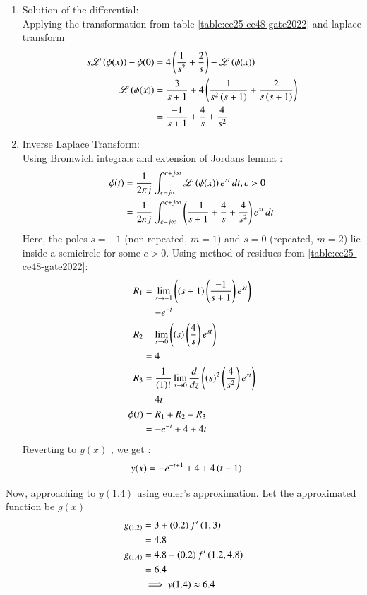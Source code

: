 \documentclass[journal,12pt,onecolumn]{IEEEtran}
\theoremstyle{remark}
\begin{document}
\begin{enumerate}
    \item Solution of the differential:\\
 Applying the transformation from table \ref{table:ee25-ce48-gate2022} and laplace transform 
    \begin{align}
             s\mathscr{L}\left(\phi(x)\right) - \phi(0) &= 4\left(\frac{1}{s^2}+\frac{2}{s}\right)-\mathscr{L}\left(\phi(x)\right)\\
             \mathscr{L}\left(\phi(x)\right) &= \frac{3}{s+1} + 4\left(\frac{1}{s^2\left(s+1\right)}+\frac{2}{s\left(s+1\right)}\right)\\
             &=\frac{-1}{s+1} + \frac{4}{s} + \frac{4}{s^2}
    \end{align}
\item  Inverse Laplace Transform:\\
Using Bromwich integrals and extension of Jordans lemma :
\begin{align}
    \phi(t) &= \frac{1}{2\pi j}\int_{c-j\infty}^{c+j\infty}\mathscr{L}\left(\phi(x)\right)e^{st}\,dt , c > 0\\
     &= \frac{1}{2\pi j}\int_{c-j\infty}^{c+j\infty}\left(\frac{-1}{s+1} + \frac{4}{s} + \frac{4}{s^2}\right)e^{st}\,dt
\end{align}
Here, the poles $s=-1$ (non repeated, $m=1$) and $s=0$ (repeated, $m=2$) lie inside a semicircle for some $c>0$. Using method of residues from \ref{table:ee25-ce48-gate2022}:
\begin{align}
    R_1 &= \lim\limits_{s\to -1}\left({\left(s+1\right)}\left(\frac{-1}{s+1}\right)e^{st}\right) \\
    &= -e^{-t}\\
   R_2 &= \lim\limits_{s\to 0}\left({\left(s\right)}\left(\frac{4}{s}\right)e^{st}\right)\\
   &= 4\\
 R_3&=\frac{1}{\left(1\right)!}\lim\limits_{s\to 0}\frac{d}{dz}\left({(s)}^{2}\left(\frac{4}{s^2}\right)e^{st}\right)\\
 &=4t\\
\phi(t) &= R_1 + R_2 + R_3\\
&= -e^{-t} + 4 + 4t
\end{align}
Reverting to $y(x)$ , we get :
\begin{align}
    y(x) &= -e^{-t+1} + 4 + 4\left(t-1\right)
\end{align}
\end{enumerate}
Now, approaching to $y(1.4)$ using euler's approximation. Let the approximated function be $g(x)$
\begin{align}
    g_{\left(1.2\right)} &= 3 + \left(0.2\right)f'\left(1,3\right)\\
    &=4.8\\
    g_{\left(1.4\right)} &= 4.8 +\left(0.2\right)f'\left(1.2,4.8\right)\\
    &= 6.4\\
    &\implies y(1.4) \approx 6.4 
\end{align}
\end{document}

